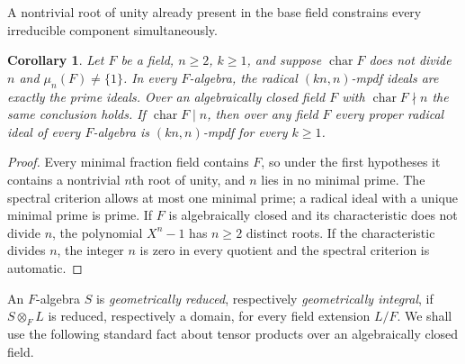 \documentclass[11pt,a4paper]{amsart}
\newtheorem{corollary}[theorem]{Corollary}
\theoremstyle{definition}
\theoremstyle{remark}
\numberwithin{equation}{section}
\begin{document}
A nontrivial root of unity already present in the base field constrains
every irreducible component simultaneously.

\begin{corollary}\label{cor:base-field}
Let $F$ be a field, $n\ge2$, $k\ge1$, and suppose $\operatorname{char}F$
does not divide $n$ and $\mu_n(F)\ne\{1\}$.  In every $F$-algebra,
the radical $(kn,n)$-mpdf ideals are exactly the prime ideals.
Over an algebraically closed field $F$ with
$\operatorname{char}F\nmid n$ the same conclusion holds.
If $\operatorname{char}F\mid n$, then over any field $F$ every proper radical ideal of
every $F$-algebra is $(kn,n)$-mpdf for every $k\ge1$.
\end{corollary}
\begin{proof}
Every minimal fraction field contains $F$, so under the first
hypotheses it contains a nontrivial $n$th root of unity, and $n$ lies
in no minimal prime.
The spectral criterion allows at most one minimal prime; a radical
ideal with a unique minimal prime is prime.  If $F$ is algebraically
closed and its characteristic does not divide $n$, the polynomial
$X^n-1$ has $n\ge2$ distinct roots.  If the characteristic divides
$n$, the integer $n$ is zero in every quotient and the spectral
criterion is automatic.
\end{proof}

An $F$-algebra $S$ is \emph{geometrically reduced}, respectively
\emph{geometrically integral}, if $S\otimes_F L$ is reduced,
respectively a domain, for every field extension $L/F$.
We shall use the following standard fact about tensor products over an algebraically closed field.
\end{document}
